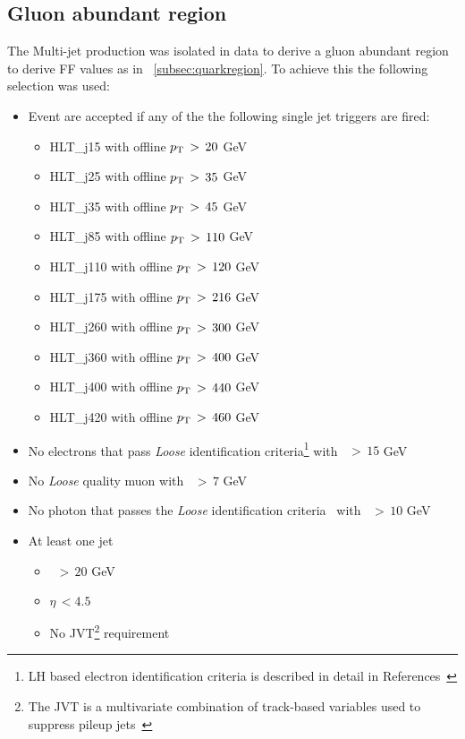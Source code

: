 	\subsection{Gluon abundant region}\label{subsec:gluonregion}
	The Multi-jet production was isolated in data to derive a gluon abundant region to derive FF values as in ~\ref{subsec:quarkregion}. To achieve this the following selection was used:
	\begin{itemize}
	\item Event are accepted if any of the the following single jet triggers are fired: 
	\begin{itemize}
		\item HLT\_j15 with offline $p_{\mathrm{T}}\,>\,20$ GeV
		\item HLT\_j25 with offline $p_{\mathrm{T}}\,>\,35$ GeV
		\item HLT\_j35 with offline $p_{\mathrm{T}}\,>\,45$ GeV
		\item HLT\_j85 with offline $p_{\mathrm{T}}\,>\,110$ GeV
		\item HLT\_j110 with offline $p_{\mathrm{T}}\,>\,120$ GeV
		\item HLT\_j175 with offline $p_{\mathrm{T}}\,>\,216$ GeV
		\item HLT\_j260 with offline $p_{\mathrm{T}}\,>\,300$ GeV
		\item HLT\_j360 with offline $p_{\mathrm{T}}\,>\,400$ GeV
		\item HLT\_j400 with offline $p_{\mathrm{T}}\,>\,440$ GeV
		\item HLT\_j420 with offline $p_{\mathrm{T}}\,>\,460$ GeV
	\end{itemize}
	\item  No electrons that pass \textit{Loose} identification criteria\footnote{\ac{LH} based electron identification criteria is described in detail in References~\cite{ele_id,Aad_2019}} with \pt\ $>\,15$ GeV
	\item No \textit{Loose} quality muon with \pt\ $>\,7$ GeV
	\item No photon that passes the \textit{Loose} identification criteria~\cite{ele_id,Aad_2019} with \pt\ $>\,10$ GeV 
	\item At least one jet
	\begin{itemize}
	\item \pt\ $>\,20$ GeV
	\item $\eta\,<4.5$
	\item No \ac{JVT}\footnote{The \ac{JVT} is a multivariate combination of track-based variables used to suppress pileup jets~\cite{ATLAS-CONF-2014-018}} requirement 

\end{itemize}
\end{itemize}
